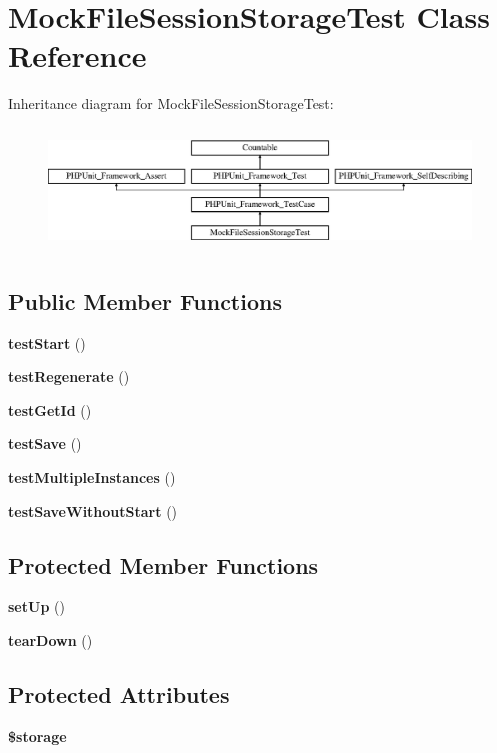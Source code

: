 \section{Mock\+File\+Session\+Storage\+Test Class Reference}
\label{class_symfony_1_1_component_1_1_http_foundation_1_1_tests_1_1_session_1_1_storage_1_1_mock_file_session_storage_test}
Inheritance diagram for Mock\+File\+Session\+Storage\+Test\+:\begin{figure}[H]
\begin{center}
\leavevmode
\includegraphics[height=3.303835cm]{class_symfony_1_1_component_1_1_http_foundation_1_1_tests_1_1_session_1_1_storage_1_1_mock_file_session_storage_test}
\end{center}
\end{figure}
\subsection*{Public Member Functions}
\begin{DoxyCompactItemize}
\item 
{\bf test\+Start} ()
\item 
{\bf test\+Regenerate} ()
\item 
{\bf test\+Get\+Id} ()
\item 
{\bf test\+Save} ()
\item 
{\bf test\+Multiple\+Instances} ()
\item 
{\bf test\+Save\+Without\+Start} ()
\end{DoxyCompactItemize}
\subsection*{Protected Member Functions}
\begin{DoxyCompactItemize}
\item 
{\bf set\+Up} ()
\item 
{\bf tear\+Down} ()
\end{DoxyCompactItemize}
\subsection*{Protected Attributes}
\begin{DoxyCompactItemize}
\item 
{\bf \$storage}
\end{DoxyCompactItemize}
